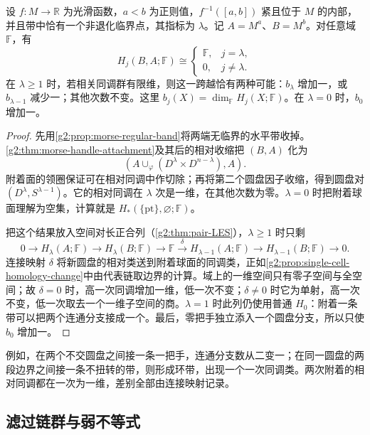 \begin{proposition}\label{g2:prop:morse-relative-contribution}
	设 \(f:M\to\mathbb R\) 为光滑函数，\(a<b\) 为正则值，\(f^{-1}([a,b])\) 紧且位于 \(M\) 的内部，并且带中恰有一个非退化临界点，其指标为 \(\lambda\)。记 \(A=M^a\)、\(B=M^b\)。对任意域 \(\mathbb F\)，有
	\[
		H_j(B,A;\mathbb F)\cong
		\begin{cases}
			\mathbb F,&j=\lambda,\\
			0,&j\ne\lambda.
		\end{cases}
	\]
	在 \(\lambda\ge1\) 时，若相关同调群有限维，则这一跨越恰有两种可能：\(b_\lambda\) 增加一，或 \(b_{\lambda-1}\) 减少一；其他次数不变。这里 \(b_j(X)=\dim_{\mathbb F}H_j(X;\mathbb F)\)。在 \(\lambda=0\) 时，\(b_0\) 增加一。
\end{proposition}
\begin{proof}
	先用\cref{g2:prop:morse-regular-band}将两端无临界的水平带收掉。\cref{g2:thm:morse-handle-attachment}及其后的相对收缩把 \((B,A)\) 化为
	\[
		(A\cup_\varphi(D^\lambda\times D^{n-\lambda}),A).
	\]
	附着面的领圈保证可在相对同调中作切除；再将第二个圆盘因子收缩，得到圆盘对 \((D^\lambda,S^{\lambda-1})\)。它的相对同调在 \(\lambda\) 次是一维，在其他次数为零。\(\lambda=0\) 时把附着球面理解为空集，计算就是 \(H_*(\{\mathrm{pt}\},\varnothing;\mathbb F)\)。

	把这个结果放入空间对长正合列（\cref{g2:thm:pair-LES}），\(\lambda\ge1\) 时只剩
	\[
		0\longrightarrow H_\lambda(A;\mathbb F)\longrightarrow H_\lambda(B;\mathbb F)
		\longrightarrow\mathbb F\xrightarrow{\delta}H_{\lambda-1}(A;\mathbb F)
		\longrightarrow H_{\lambda-1}(B;\mathbb F)\longrightarrow0.
	\]
	连接映射 \(\delta\) 将新圆盘的相对类送到附着球面的同调类，正如\cref{g2:prop:single-cell-homology-change}中由代表链取边界的计算。域上的一维空间只有零子空间与全空间；故 \(\delta=0\) 时，高一次同调增加一维，低一次不变；\(\delta\ne0\) 时它为单射，高一次不变，低一次取去一个一维子空间的商。\(\lambda=1\) 时此列仍使用普通 \(H_0\)：附着一条带可以把两个连通分支接成一个。最后，零把手独立添入一个圆盘分支，所以只使 \(b_0\) 增加一。
\end{proof}

例如，在两个不交圆盘之间接一条一把手，连通分支数从二变一；在同一圆盘的两段边界之间接一条不扭转的带，则形成环带，出现一个一次同调类。两次附着的相对同调都在一次为一维，差别全部由连接映射记录。

\subsection{滤过链群与弱不等式}
\label{g2:subsec:1703:02}

